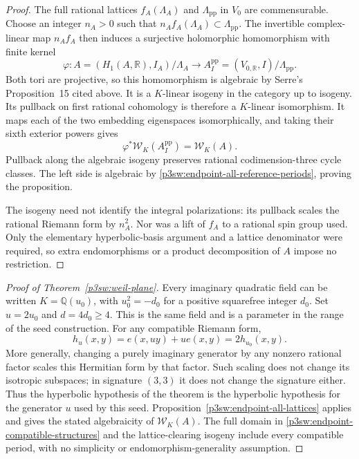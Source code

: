 \documentclass[11pt]{article}
\newcommand{\Q}{\mathbb Q}
\newcommand{\R}{\mathbb R}
\numberwithin{equation}{section}
\begin{document}
\begin{proof}
The full rational lattices \(f_A(\Lambda_A)\) and
\(\Lambda_{\mathrm{pp}}\) in \(V_0\) are commensurable.  Choose
an integer \(n_A>0\) such that
\(n_A f_A(\Lambda_A)\subset\Lambda_{\mathrm{pp}}\).  The
invertible complex-linear map \(n_A f_A\) then induces a
surjective holomorphic homomorphism with finite kernel
\begin{equation}
\label{p3sw:endpoint-target-isogeny}
 \varphi:A=(H_1(A,\R),I_A)/\Lambda_A
       \longrightarrow
       A_I^{\mathrm{pp}}=(V_{0,\R},I)/\Lambda_{\mathrm{pp}}.
\end{equation}
Both tori are projective, so this homomorphism is algebraic by
Serre's Proposition~15 cited above.  It is a \(K\)-linear
isogeny in the category up to isogeny.  Its pullback on first
rational cohomology is therefore a \(K\)-linear isomorphism.
It maps each of the two embedding eigenspaces isomorphically,
and taking their sixth exterior powers gives
\[
 \varphi^*\mathcal W_K(A_I^{\mathrm{pp}})=\mathcal W_K(A).
\]
Pullback along the algebraic isogeny preserves rational
codimension-three cycle classes.  The left side is algebraic
by \eqref{p3sw:endpoint-all-reference-periods}, proving the
proposition.

The isogeny need not identify the integral polarizations:
its pullback scales the rational Riemann form by \(n_A^2\).
Nor was a lift of \(f_A\) to a rational spin group used.
Only the elementary hyperbolic-basis argument and a lattice
denominator were required, so extra endomorphisms or a product
decomposition of \(A\) impose no restriction.
\end{proof}

\begin{proof}[Proof of Theorem~\ref{p3sw:weil-plane}]
Every imaginary quadratic field can be written
\(K=\Q(u_0)\), with \(u_0^2=-d_0\) for a positive squarefree
integer \(d_0\).  Set \(u=2u_0\) and \(d=4d_0\geq4\).
This is the same field and is a parameter in the range of the
seed construction.  For any compatible Riemann form,
\[
 h_u(x,y)=e(x,uy)+u e(x,y)=2h_{u_0}(x,y).
\]
More generally, changing a purely imaginary generator by any
nonzero rational factor scales this Hermitian form by that
factor.  Such scaling does not change its isotropic subspaces;
in signature \((3,3)\) it does not change the signature either.
Thus the hyperbolic hypothesis of the theorem is the hyperbolic
hypothesis for the generator \(u\) used by this seed.
Proposition~\ref{p3sw:endpoint-all-lattices} applies and gives
the stated algebraicity of \(\mathcal W_K(A)\).
The full domain in \eqref{p3sw:endpoint-compatible-structures}
and the lattice-clearing isogeny include every compatible period,
with no simplicity or endomorphism-generality assumption.
\end{proof}
\end{document}
